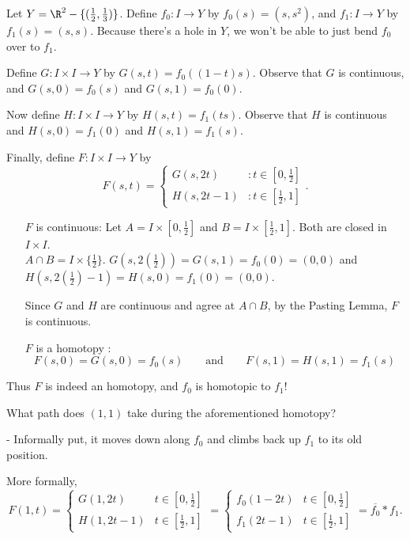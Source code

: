 \begin{example}
Let $Y = \R^2 - \{(\frac{1}{2}, \frac{1}{3})\}$. Define $f_0: I \rightarrow Y$ by $f_0(s) = (s,s^2)$, and $f_1: I \rightarrow Y$ by $f_1(s) = (s,s).$  Because there's a hole in $Y$, we won't be able to just bend $f_0$ over to $f_1$.

Define $G: I \times I \rightarrow Y$  by $G(s,t) = f_0((1-t)s)$. Observe that $G$ is continuous, and $G(s,0) = f_0(s)$ and $G(s,1) = f_0(0)$.

Now define $H: I \times I \rightarrow Y$ by $H(s,t) = f_1(ts)$.  Observe that $H$ is continuous and $H(s,0) = f_1(0)$ and $H(s,1) = f_1(s)$.

Finally, define $F: I \times I \rightarrow Y$ by
\begin{displaymath}
   F(s, t) = \left\{
     \begin{array}{lr}
       G(s, 2t) & : t \in [0, \frac{1}{2}]\\
       H(s, 2t-1) & : t \in [\frac{1}{2}, 1]
     \end{array}
   \right. .
\end{displaymath}

\begin{itemize}
\item[ $F$ is continuous: ]
Let $A = I \times [0, \frac{1}{2}]$ and $B = I \times [\frac{1}{2}, 1]$. Both are closed in $I\times I$.\\
$A \cap B = I \times \{\frac{1}{2}\}$. 
$G(s, 2(\frac{1}{2})) = G(s, 1) = f_0(0)  = (0,0)$ and   $H(s, 2(\frac{1}{2})-1) = H(s, 0) = f_1(0)  = (0,0)$.

Since $G$ and $H$ are continuous and agree at $A\cap B$, by the Pasting Lemma, $F$ is continuous.

\item[$F$ is a homotopy : ]
\[F(s, 0) = G(s, 0) = f_0(s) \qquad\text{and}\qquad F(s, 1) = H(s, 1) = f_1(s) \]
\end{itemize}
Thus $F$ is indeed an homotopy, and $f_0$ is homotopic to $f_1$!
\end{example}

What path does $(1, 1)$ take during the aforementioned homotopy?

 - Informally put, it moves down along $f_0$ and climbs back up $f_1$ to its old position.

More formally,
\begin{displaymath}
   F(1, t) = \begin{cases}
       G(1, 2t) &  t \in [0, \frac{1}{2}]\\
       H(1, 2t-1) &  t \in [\frac{1}{2}, 1]
     \end{cases}
   = \begin{cases}
      f_0(1-2t) &  t \in [0, \frac{1}{2}]\\
       f_1(2t-1) & t \in [\frac{1}{2}, 1]
     \end{cases}
   =\overline{ f_0} \ast f_1.
\end{displaymath}


